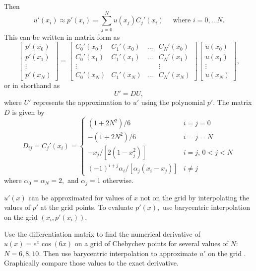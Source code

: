 Then 
\[u'(x_i) \approx p'(x_i) = \sum_{j=0}^N u(x_j)C_j'(x_i) \quad \text{ where } i = 0, \ldots N.\]
This can be written in matrix form as 
\begin{equation*}
	\left[\begin{array}{c}p'(x_0) \\p'(x_1)\\\vdots \\p'(x_N)\end{array}\right] =
\left[\begin{array}{cccc}C_0'(x_0) & C_1'(x_0) & \ldots & C_N'(x_0) \\C_0'(x_1) & C_1'(x_1) & \ldots & C_N'(x_1) \\\vdots &  &  & \vdots \\C_0'(x_N) & C_1'(x_N) & \ldots & C_N'(x_N)\end{array}\right]
\left[\begin{array}{c}u(x_0) \\u(x_1)\\\vdots \\u(x_N)\end{array}\right],
\end{equation*}
or in shorthand as 
\[U' = D U,\]
where $U'$ represents the approximation to $u'$ using the polynomial $p'$.
The matrix $D$ is given by
\begin{equation*}
D_{ij} = C_j'(x_i) = \begin{cases} (1+2N^2)/6 & i=j=0 \\ -(1+2N^2)/6 & i=j=N \\
-x_j/[2(1-x_j^2)] & i=j, \, 0<j<N \\ 
(-1)^{i+j}\alpha_i/[\alpha_j(x_i-x_j)] & i \not = j
   \end{cases}
\end{equation*}
where $\alpha_0 = \alpha_N = 2,$ and $\alpha_j = 1$ otherwise. 

$u'(x)$ can be approximated for values of $x$ not on the grid by interpolating the values of $p'$ at the grid points.
To evaluate $p'(x),$ use barycentric interpolation on the grid $(x_i,p'(x_i))$.

\begin{problem}

	
Use the differentiation matrix to find the numerical derivative of $u(x) = e^{x}\cos(6x)$ on a grid of Chebychev points for several values of $N:$ $N=6, 8, 10.$
Then use barycentric interpolation to approximate $u'$ on the grid .
Graphically compare those values to the exact derivative. 
\end{problem}

